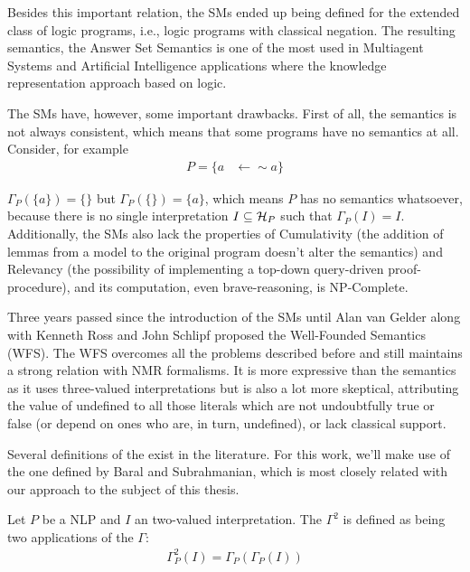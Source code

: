 Besides this important relation, the SMs ended up being defined for the extended class of logic programs, i.e., logic programs with classical negation. The resulting semantics, the Answer Set Semantics\cite{answerSets} is one of the most used in Multiagent Systems and Artificial Intelligence applications where the knowledge representation approach based on logic.

The SMs have, however, some important drawbacks. First of all, the \sms semantics is not always consistent, which means that some programs have no semantics at all. Consider, for example 
\begin{align*}
P=\{a&\leftarrow\sim a\}
\end{align*}

$\Gamma_{P}(\{a\})=\{\}$ but $\Gamma_{P}(\{\})=\{a\}$, which means $P$ has no semantics whatsoever, because there is no single interpretation $I\subseteq{\cal{H}}_{P}$ such that $\Gamma_ {P}(I)=I$. Additionally, the SMs also lack the properties of Cumulativity (the addition of lemmas from a model to the original program doesn't alter the semantics) and Relevancy (the possibility of implementing a top-down query-driven proof-procedure), and its computation, even brave-reasoning, is NP-Complete\cite{npComputation}.

Three years passed since the introduction of the SMs until Alan van Gelder along with Kenneth Ross and John Schlipf proposed\cite{wfsMain} the Well-Founded Semantics (WFS). The WFS overcomes all the problems described before and still maintains a strong relation with NMR formalisms. It is more expressive than the \sms semantics as it uses three-valued interpretations but is also a lot more skeptical, attributing the value of undefined to all those literals which are not undoubtfully true or false (or depend on ones who are, in turn, undefined), or lack classical support.

Several definitions of the \wfs exist in the literature. For this work, we'll make use of the one defined by Baral and Subrahmanian\cite{wfsDualities}, which is most closely related with our approach to the subject of this thesis.

\begin{definition}
Let $P$ be a NLP and $I$ an two-valued interpretation. The \BSo $\Gamma^{2}$ is defined as being two applications of the \GFo $\Gamma$:
\begin{align*}
\Gamma_{P}^{2}(I) = \Gamma_{P}(\Gamma_{P}(I))
\end{align*}
\end{definition}

